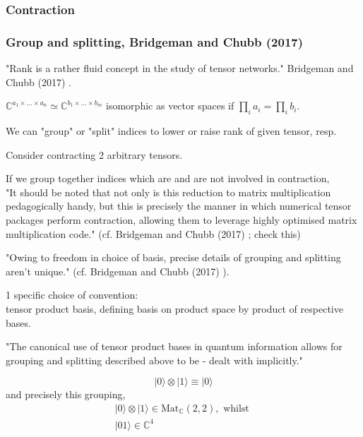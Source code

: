 \documentclass[10pt]{amsart}
\begin{document}
\begin{multicols*}{2}
\subsubsection{Contraction}

\subsubsection{Group and splitting, Bridgeman and Chubb (2017) \cite{BrCh2017} }

"Rank is a rather fluid concept in the study of tensor networks."  Bridgeman and Chubb (2017) \cite{BrCh2017}.  

$\mathbb{C}^{a_1 \times \dots \times a_n} \simeq \mathbb{C}^{b_1 \times \dots \times b_m}$ isomorphic as vector spaces if $\prod_i a_i = \prod_i b_i$.  

We can "group" or "split" indices to lower or raise rank of given tensor, resp.  

Consider contracting 2 arbitrary tensors.  

If we group together indices which are and are not involved in contraction, \\
"It should be noted that not only is this reduction to matrix multiplication pedagogically handy, but this is precisely the manner in which numerical tensor packages perform contraction, allowing them to leverage highly optimised matrix multiplication code." (cf. Bridgeman and Chubb (2017) \cite{BrCh2017}; check this)

"Owing to freedom in choice of basis, precise details of grouping and splitting aren't unique." (cf. Bridgeman and Chubb (2017) \cite{BrCh2017}).  

1 specific choice of convention:  \\
tensor product basis, defining basis on product space by product of respective bases.  

"The canonical use of tensor product bases in quantum information allows for grouping and splitting described above to be - dealt with implicitly."  


\begin{equation}
 | 0 \rangle \otimes | 1 \rangle \equiv | 0 \rangle 
\end{equation} and precisely this grouping, 
\begin{equation}
\begin{gathered}
	| 0 \rangle \otimes | 1 \rangle \in \text{Mat}_{\mathbb{C}}(2,2), \text{ whilst } \\ 
 | 0 1 \rangle \in \mathbb{C}^4  
\end{gathered}
\end{equation}


\end{multicols*}
\end{document}
